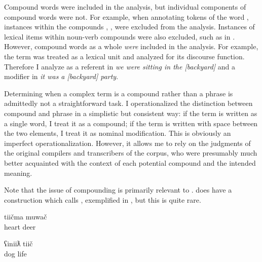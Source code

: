Compound words were included in the analysis, but individual components of compound words were not. For example, when annotating tokens of the word , instances within the compounds , ,  were excluded from the analysis. Instances of lexical items within noun-verb compounds  were also excluded, such as  in . However, compound words as a whole \emph{were} included in the analysis. For example, the term  was treated as a lexical unit and analyzed for its discourse function. Therefore I analyze  as a referent in \textit{we were sitting in the [backyard]} and a modifier in \textit{it was a [backyard] party}.

Determining when a complex term is a compound rather than a phrase is admittedly not a straightforward task. I operationalized the distinction between compound and phrase in a simplistic but consistent way: if the term is written as a single word, I treat it as a compound; if the term is written with space between the two elements, I treat it as nominal modification. This is obviously an imperfect operationalization. However, it allows me to rely on the judgments of the original compilers and transcribers of the corpus, who were presumably much better acquainted with the context of each potential compound and the intended meaning.

Note that the issue of compounding is primarily relevant to .  does have a construction which \textcite[90]{Nakayama2001} calls , exemplified in , but this is quite rare.

\begin{exe}

  \ex\label{ex:3.4}

  \begin{xlist}

    \ex\label{ex:3.4a}
    \gll tiičma muwač\\
         heart  deer\\

    \ex\label{ex:3.4b}
    \gll ʕiniiƛ tiič\\
         dog    life\\

  \end{xlist}

\end{exe}

